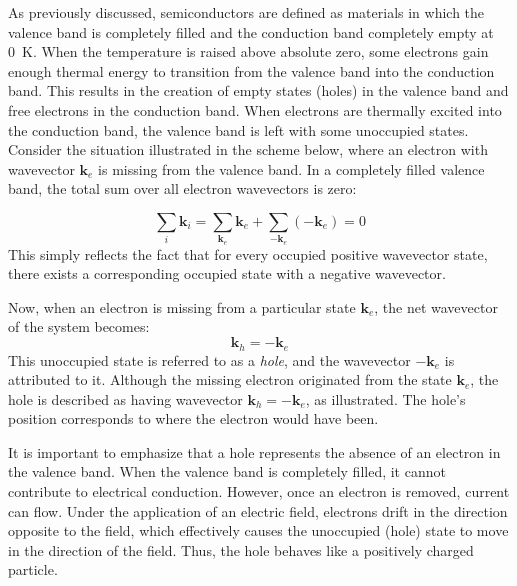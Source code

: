 As previously discussed, semiconductors are defined as materials in which the valence band is completely filled and the conduction band completely empty at 0~K. When the temperature is raised above absolute zero, some electrons gain enough thermal energy to transition from the valence band into the conduction band. This results in the creation of empty states (holes) in the valence band and free electrons in the conduction band.
When electrons are thermally excited into the conduction band, the valence band is left with some unoccupied states. Consider the situation illustrated in the scheme below, where an electron with wavevector \( \mathbf{k}_e \) is missing from the valence band. In a completely filled valence band, the total sum over all electron wavevectors is zero:

\begin{equation*}
	\sum_i \mathbf{k}_i = \sum_{\mathbf{k}_e} \mathbf{k}_e + \sum_{-\mathbf{k}_e} (-\mathbf{k}_e) = 0
\end{equation*}
\noindent
This simply reflects the fact that for every occupied positive wavevector state, there exists a corresponding occupied state with a negative wavevector.

Now, when an electron is missing from a particular state \( \mathbf{k}_e \), the net wavevector of the system becomes:
\begin{equation*}
	\mathbf{k}_h = -\mathbf{k}_e
\end{equation*}
\noindent
This unoccupied state is referred to as a \textit{hole}, and the wavevector \( -\mathbf{k}_e \) is attributed to it. Although the missing electron originated from the state \( \mathbf{k}_e \), the hole is described as having wavevector \( \mathbf{k}_h = -\mathbf{k}_e \), as illustrated. The hole's position corresponds to where the electron would have been.

It is important to emphasize that a hole represents the absence of an electron in the valence band. When the valence band is completely filled, it cannot contribute to electrical conduction. However, once an electron is removed, current can flow. Under the application of an electric field, electrons drift in the direction opposite to the field, which effectively causes the unoccupied (hole) state to move in the direction of the field. Thus, the hole behaves like a positively charged particle.

